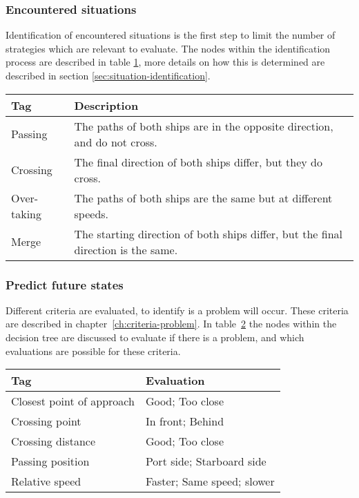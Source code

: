 \subsubsection{Encountered situations}
Identification of encountered situations is the first step to limit the number of strategies which are relevant to evaluate. The nodes within the identification process are described in table \ref{tab:situations}, more details on how this is determined are described in section \ref{sec:situation-identification}.
\begin{table}[H]
	\begin{tabular}{p{}|p{}}
		\toprule
		Tag & Description\\
		\midrule
		Passing & The paths of both ships are in the opposite direction, and do not cross. \\
		Crossing & The final direction of both ships differ, but they do cross. \\
		Over-taking & The paths of both ships are the same but at different speeds. \\
		Merge & The starting direction of both ships differ, but the final direction is the same. \\
		\bottomrule
	\end{tabular}
	
	\label{tab:situations}
\end{table}

\subsubsection{Predict future states}
Different criteria are evaluated, to identify is a problem will occur. These criteria are described in chapter~\ref{ch:criteria-problem}. In table~\ref{tab:identification-criteria} the nodes within the decision tree are discussed to evaluate if there is a problem, and which evaluations are possible for these criteria. 
\begin{table}[H]
	\begin{tabular}{p{}|p{}}
		\toprule
		Tag & Evaluation \\
		\midrule
		Closest point of approach & Good; Too close \\
		Crossing point & In front; Behind \\
		Crossing distance & Good; Too close \\
		Passing position & Port side; Starboard side \\
		Relative speed & Faster; Same speed; slower \\
		\bottomrule
	\end{tabular}
	
	\label{tab:identification-criteria}
\end{table}


